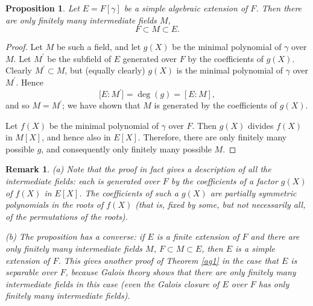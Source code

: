 \documentclass[a4paper,11pt,final,openany]{memoir}
\newtheorem{proposition}[X]{Proposition}
\newtheorem{remark}[X]{Remark}
\theoremstyle{nonumberplain}
\newtheorem{proof}{Proof.}
\begin{document}
\begin{proposition}
\label{ag3}Let $E=F[\gamma]$ be a simple algebraic extension of $F$. Then
there are only finitely many intermediate fields $M$,
\[
F\subset M\subset E.
\]

\end{proposition}

\begin{proof}
Let $M$ be such a field, and let $g(X)$ be the minimal polynomial of $\gamma$
over $M$. Let $M^{\prime}$ be the subfield of $E$ generated over $F$ by the
coefficients of $g(X)$. Clearly $M^{\prime}\subset M$, but (equally clearly)
$g(X)$ is the minimal polynomial of $\gamma$ over $M^{\prime}$. Hence
\[
\lbrack E\colon M^{\prime}]=\deg(g)=[E\colon M],
\]
and so $M=M^{\prime}$; we have shown that $M$ is generated by the coefficients
of $g(X)$.

Let $f(X)$ be the minimal polynomial of $\gamma$ over $F$. Then $g(X)$ divides
$f(X)$ in $M[X]$, and hence also in $E[X]$. Therefore, there are only finitely
many possible $g$, and consequently only finitely many possible $M$.
\end{proof}

\begin{remark}
\label{ag4}(a) Note that the proof in fact gives a description of all the
intermediate fields: each is generated over $F$ by the coefficients of a
factor $g(X)$ of $f(X)$ in $E[X]$. The coefficients of such a $g(X)$ are
partially symmetric polynomials in the roots of $f(X)$ (that is, fixed by
some, but not necessarily all, of the permutations of the roots).

(b) The proposition has a converse: if $E$ is a finite extension of $F$ and
there are only finitely many intermediate fields $M$, $F\subset M\subset E$,
then $E$ is a simple extension of $F$. This gives another proof of Theorem
\ref{ag1} in the case that $E$ is separable over $F$, because Galois theory
shows that there are only finitely many intermediate fields in this case (even
the Galois closure of $E$ over $F$ has only finitely many intermediate fields).
\end{remark}
\end{document}

